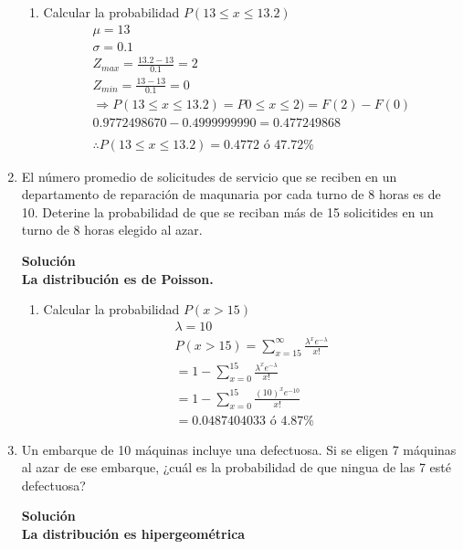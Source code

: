 \begin{enumerate}
\begin{enumerate}
    	\item Calcular la probabilidad $P(13\leq x\leq 13.2)$ \\
    	\begin{gather*}
		\mu = 13\\
		\sigma = 0.1\\
		Z_{max} = \frac{13.2-13}{0.1} = 2\\
		Z_{min} = \frac{13-13}{0.1} = 0\\
		\Rightarrow P(13\leq x\leq 13.2)=P0\leq x\leq 2) = F(2) - F(0)\\
		0.9772498670-0.4999999990 = 0.477249868\\\\
		\therefore  P(13\leq x\leq 13.2) =  0.4772 \text{ ó } 47.72\%
    	\end{gather*}
    \end{enumerate}

	\item El número promedio de solicitudes de servicio que se reciben en un departamento de reparación de maqunaria por cada turno de 8 horas es de 10. Deterine la probabilidad de que se reciban más de 15 solicitides en un turno de 8 horas elegido al azar.

	\textbf{Solución}\\
	\textbf{La distribución es de Poisson.}
    \begin{enumerate}

    	\item Calcular la probabilidad $P( x >15)$ \\
    	\begin{gather*}
		\lambda = 10\\
		P( x >15) = \sum_{x=15}^{\infty}\frac{\lambda^{x}e^{-\lambda}}{x!}\\
		=1- \sum_{x=0}^{15}\frac{\lambda^{x}e^{-\lambda}}{x!}\\
		=1- \sum_{x=0}^{15}\frac{(10)^{x}e^{-10}}{x!}\\
		=0.0487404033 \text{ ó } 4.87\%
    	\end{gather*}
    \end{enumerate}

    \item Un embarque de 10 máquinas incluye una defectuosa. Si se eligen 7 máquinas al azar de ese embarque, ¿cuál es la probabilidad de que ningua de las 7 esté defectuosa?

	\textbf{Solución}\\
	\textbf{La distribución es hipergeométrica}
    \begin{enumerate}


\end{enumerate}
\end{enumerate}
